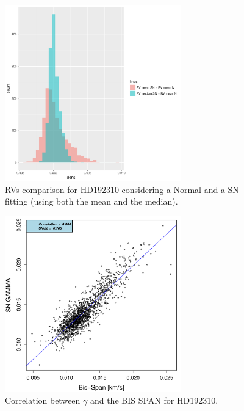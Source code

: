 \documentclass{aa}
\begin{document}
\iffalse
%
\begin{figure}[htbp]
   \centering
\includegraphics[height = 3in]{[0]HD19231_HistogramsDiff.pdf} 
   \caption{RVs comparison for HD192310 considering a Normal and a SN fitting (using both the mean and the median).}
   \label{fig:HD192310:RV}
\end{figure}
%
\begin{figure}[htbp]
   \centering
\includegraphics[height = 3in]{HD19231_[2]gamma_vs_bisspan.pdf} 
   \caption{Correlation between $\gamma$ and the BIS SPAN for HD192310.}
   \label{fig:Gliese785:corr.gamma}
\end{figure}
%
\end{document}
